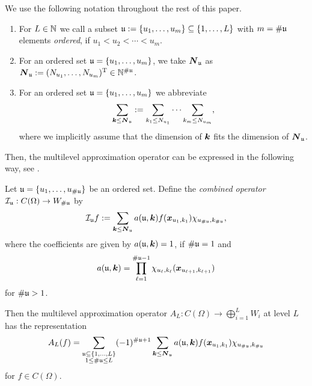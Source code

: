 \documentclass[	a4paper, 
								11pt]{article}
\theoremstyle{plain}
\begin{document}
We use the following notation throughout the rest of this paper.

\begin{definition}
\begin{enumerate}
 \item For $ L \in \mathbb{N} $ we call a subset $ \mathfrak{u} := \{ u_1, \dots, u_m \} 
 \subseteq \{1, \dots, L \} $ with $ m = \# \mathfrak{u} $ elements \emph{ordered}, if $ u_1 < u_2 < \cdots < u_m $.
 \item  For an ordered set $ \mathfrak{u} = \{ u_1, \dots, u_m \} $, we take 
 $ \boldsymbol{N}_{\mathfrak{u}} $ as $ \boldsymbol{N}_{\mathfrak{u}} := (N_{u_1}, \dots, N_{u_m})^{\text{T}} \in \mathbb{N}^{\# \mathfrak{u}} $.
 \item For an ordered set $ \mathfrak{u} = \{ u_1, \dots, u_m \} $ we abbreviate
 \begin{align*}
  \sum_{\boldsymbol{k} \leq \boldsymbol{N}_{\mathfrak{u}}} := \sum_{k_1 \leq N_{u_1}} \cdots \sum_{k_m \leq
  N_{u_m}},
 \end{align*}
 where we implicitly assume that the dimension of $ \boldsymbol{k} $ fits the dimension of 
 $ \boldsymbol{N}_{\mathfrak{u}} $.
\end{enumerate}
\end{definition}

Then, the multilevel approximation operator can be expressed in the following way, see \cite[Theorem 3.9]{kempf:TPML}.

\begin{theorem}\label{thrm:RepresentationMultilevelOperator}
 Let $ \mathfrak{u} = \{u_1, \dots, u_{\# \mathfrak{u}} \} $ be an ordered set. Define the \emph{combined operator} $ \mathcal{I}_{\mathfrak{u}}: C(\Omega) \to W_{\# \mathfrak{u}} $ by
 \begin{align}\label{eq:defCombinedOperator}
     \mathcal{I}_{\mathfrak{u}} f := \sum_{\boldsymbol{k} \leq \boldsymbol{N}_{\mathfrak{u}}} a(\mathfrak{u}, \boldsymbol{k}) f(\boldsymbol{x}_{u_1,k_1}) \chi_{u_{\# \mathfrak{u}}, k_{\# \mathfrak{u}}},
 \end{align}
 where the coefficients are given by $ a(\mathfrak{u}, \boldsymbol{k}) = 1 $, if $ \# \mathfrak{u} = 1 $ and 
 \begin{align*}
     a(\mathfrak{u},\boldsymbol{k}) = \prod_{\ell = 1}^{\# \mathfrak{u} - 1} \chi_{u_{\ell}, k_{\ell}} ( \boldsymbol{x}_{u_{\ell +1},k_{\ell+1}})
 \end{align*}
 for $ \# \mathfrak{u} > 1 $.
 
 Then the multilevel approximation operator $ A_L: C(\Omega) \to \bigoplus_{i=1}^L W_i $ at level $ L$  has the representation
 \begin{align*}
     A_L(f) = \sum_{\substack{\mathfrak{u} \subseteq \{1, \dots, L \} \\ 1 \leq \# \mathfrak{u} \leq L}} (-1)^{\# \mathfrak{u} + 1} \sum_{\boldsymbol{k} \leq \boldsymbol{N}_{\mathfrak{u}}} a(\mathfrak{u}, \boldsymbol{k}) f(\boldsymbol{x}_{u_1,k_1}) \chi_{u_{\# \mathfrak{u}}, k_{\# \mathfrak{u}}}
 \end{align*}
 for $ f \in C(\Omega) $.
\end{theorem}
\end{document}
